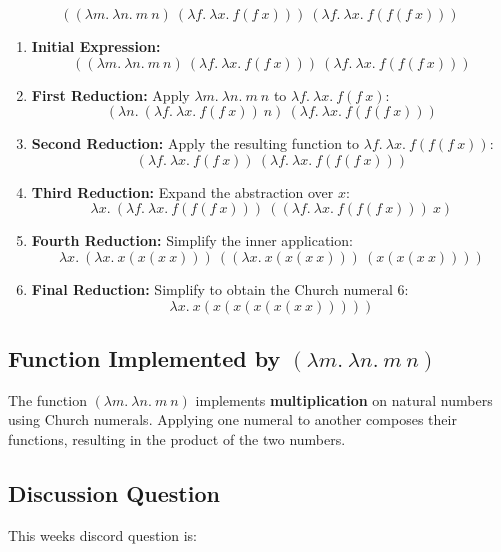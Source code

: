 \documentclass{article}
\begin{document}
\[
((\lambda m.\ \lambda n.\ m\ n)\ (\lambda f.\ \lambda x.\ f(f\ x)))\ (\lambda f.\ \lambda x.\ f(f(f\ x)))
\]

\begin{enumerate}
    \item \textbf{Initial Expression:}
    \[
    ((\lambda m.\ \lambda n.\ m\ n)\ (\lambda f.\ \lambda x.\ f(f\ x)))\ (\lambda f.\ \lambda x.\ f(f(f\ x)))
    \]

    \item \textbf{First Reduction:} Apply \(\lambda m.\ \lambda n.\ m\ n\) to \(\lambda f.\ \lambda x.\ f(f\ x)\):
    \[
    (\lambda n.\ (\lambda f.\ \lambda x.\ f(f\ x))\ n)\ (\lambda f.\ \lambda x.\ f(f(f\ x)))
    \]

    \item \textbf{Second Reduction:} Apply the resulting function to \(\lambda f.\ \lambda x.\ f(f(f\ x))\):
    \[
    (\lambda f.\ \lambda x.\ f(f\ x))\ (\lambda f.\ \lambda x.\ f(f(f\ x)))
    \]

    \item \textbf{Third Reduction:} Expand the abstraction over \(x\):
    \[
    \lambda x.\ (\lambda f.\ \lambda x.\ f(f(f\ x)))\ ((\lambda f.\ \lambda x.\ f(f(f\ x)))\ x)
    \]

    \item \textbf{Fourth Reduction:} Simplify the inner application:
    \[
    \lambda x.\ (\lambda x.\ x(x(x\ x)))\ ((\lambda x.\ x(x(x\ x)))\ (x(x(x\ x))))
    \]

    \item \textbf{Final Reduction:} Simplify to obtain the Church numeral 6:
    \[
    \lambda x.\ x(x(x(x(x(x\ x)))))
    \]
\end{enumerate}

\subsection*{Function Implemented by \((\lambda m.\ \lambda n.\ m\ n)\)}

The function \((\lambda m.\ \lambda n.\ m\ n)\) implements \textbf{multiplication} on natural numbers using Church numerals. Applying one numeral to another composes their functions, resulting in the product of the two numbers.

\subsection*{Discussion Question}

This weeks discord question is:
\end{document}
